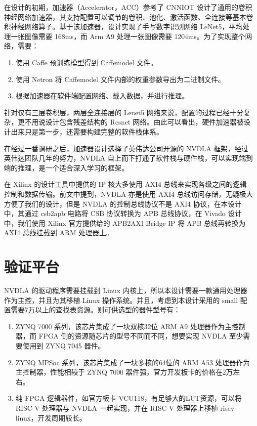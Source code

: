 在设计的初期，加速器（Accelerator，ACC）参考了 CNNIOT\cite{CNNIOT} 设计了通用的卷积神经网络加速器，其支持配置可以调节的卷积、池化、激活函数、全连接等基本卷积神经网络算子。基于该加速器，设计实现了手写数字识别网络 LeNet5，平均处理一张图像需要 168ms，而 Arm A9 处理一张图像需要 1204ms。为了实现整个网络，需要：

\begin{enumerate}
    \item 使用 Caffe 预训练模型得到 Caffemodel 文件。
    \item 使用 Netron 将 Caffemodel 文件内部的权重参数导出为二进制文件。
    \item 根据加速器在软件端配置网络、载入数据，并进行推理。
\end{enumerate}

针对仅有三层卷积层，两层全连接层的 Lenet5 网络来说，配置的过程已经十分复杂，更不用说设计包含残差结构的 Resnet 网络。由此可以看出，硬件加速器被设计出来只是第一步，还需要构建完整的软件栈体系。

在经过一番调研之后，加速器设计选择了英伟达公司开源的 NVDLA 框架，经过英伟达团队几年的努力，NVDLA 自上而下打通了软件栈与硬件栈，可以实现端到端的推理，是一个适合深入学习的框架。

在 Xilinx 的设计工具中提供的 IP 核大多使用 AXI4 总线来实现各级之间的逻辑控制和数据传输。前文中提到，NVDLA 亦是使用 AXI4 总线访问存储，无疑极大方便了我们的设计，但是 NVDLA 的控制总线协议不是 AXI4 协议，在本设计中，其通过 csb2apb 电路将 CSB 协议转换为 APB 总线协议，在 Vivado 设计中，我们使用 Xilinx 官方提供给的 APB2AXI Bridge IP 将 APB 总线再转换为 AXI4 总线挂载到 ARM 处理器上。

\section{验证平台}

NVDLA 的驱动程序需要挂载到 Linux 内核上，所以本设计需要一款通用处理器作为主控，并且为其移植 Linux 操作系统。并且，考虑到本设计采用的 small 配置需要7万以上的查找表资源。则可供选型的器件型号有：

\begin{enumerate}
    \item ZYNQ 7000 系列，该芯片集成了一块双核32位 ARM A9 处理器作为主控制器，而 FPGA 侧的资源随芯片的型号不同而不同，想要实现 NVDLA 至少需要使用到 ZYNQ 7045 器件。
    \item ZYNQ MPSoc 系列，该芯片集成了一块多核的64位的 ARM A53 处理器作为主控制器，性能相较于 ZYNQ 7000 器件强，官方开发板卡的价格在2万左右。
    \item 纯 FPGA 逻辑器件，如官方板卡 VCU118，有足够大的LUT资源，可以将 RISC-V 处理器与 NVDLA 一起实现，并在 RISC-V 处理器上移植 riscv-linux，开发周期较长。
\end{enumerate}

